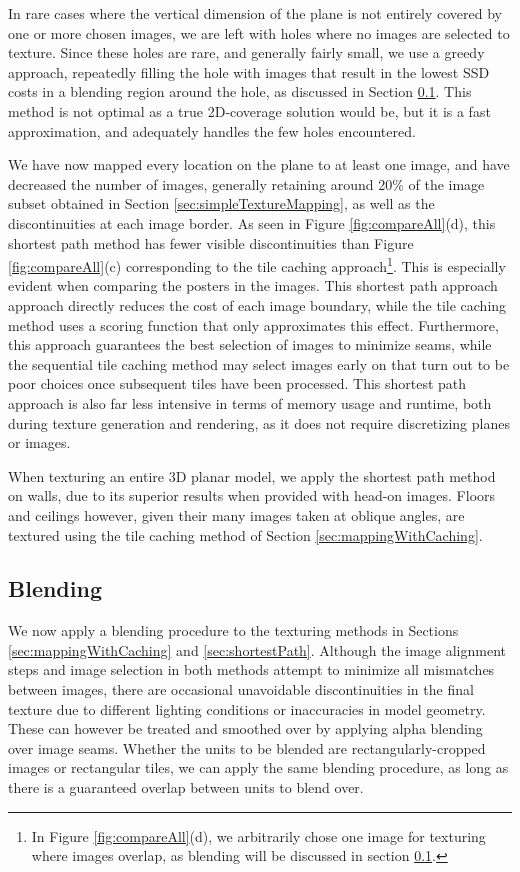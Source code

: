 \documentclass[]{spie}  %
\begin{document}
In rare cases where the vertical dimension of the plane is not
entirely covered by one or more chosen images, we are left with holes
where no images are selected to texture. Since these holes are rare,
and generally fairly small, we use a greedy approach, repeatedly
filling the hole with images that result in the lowest SSD costs in a
blending region around the hole, as discussed in Section
\ref{sec:blending}. This method is not optimal as a true 2D-coverage
solution would be, but it is a fast approximation, and adequately
handles the few holes encountered.

We have now mapped every location on the plane to at least one image,
and have decreased the number of images, generally retaining around 20\% of the image subset obtained in Section \ref{sec:simpleTextureMapping}, as
well as the discontinuities at each image border. As seen in Figure
\ref{fig:compareAll}(d), this shortest path method has fewer visible
discontinuities than Figure \ref{fig:compareAll}(c) corresponding to
the tile caching approach\footnote{In Figure \ref{fig:compareAll}(d),
  we arbitrarily chose one image for texturing where images overlap,
  as blending will be discussed in section \ref{sec:blending}.}. This
is especially evident when comparing the posters in the images. This
shortest path approach approach directly reduces the cost of each
image boundary, while the tile caching method uses a scoring function
that only approximates this effect. Furthermore, this approach
guarantees the best selection of images to minimize seams, while the
sequential tile caching method may select images early on that turn
out to be poor choices once subsequent tiles have been processed. This
shortest path approach is also far less intensive in terms of memory
usage and runtime, both during texture generation and rendering, as it
does not require discretizing planes or images.

When texturing an entire 3D planar model, we apply the shortest path
method on walls, due to its superior results when provided with
head-on images. Floors and ceilings however, given their many images
taken at oblique angles, are textured using the tile caching method of Section \ref{sec:mappingWithCaching}.


\subsection{Blending}
\label{sec:blending}
We now apply a blending procedure to the texturing methods in Sections
\ref{sec:mappingWithCaching} and \ref{sec:shortestPath}. Although the
image alignment steps and image selection in both methods attempt to
minimize all mismatches between images, there are occasional
unavoidable discontinuities in the final texture due to different
lighting conditions or inaccuracies in model geometry. These can
however be treated and smoothed over by applying alpha blending over
image seams.  Whether the units to be blended are
rectangularly-cropped images or rectangular tiles, we can apply the
same blending procedure, as long as there is a guaranteed overlap
between units to blend over.
\end{document}
